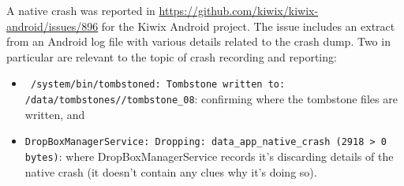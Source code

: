 A native crash was reported in \href{Kiwix Android - Issue 896}{https://github.com/kiwix/kiwix-android/issues/896} for the Kiwix Android project. The issue includes an extract from an Android log file with various details related to the crash dump. Two in particular are relevant to the topic of crash recording and reporting: 

\begin{itemize}
    \item \texttt{ /system/bin/tombstoned: Tombstone written to: /data/tombstones//tombstone\_08}: confirming where the tombstone files are written, and
    
    \item \texttt{DropBoxManagerService: Dropping: data\_app\_native\_crash (2918 > 0 bytes)}: where DropBoxManagerService records it's discarding details of the native crash (it doesn't contain any clues why it's doing so).

\end{itemize}

